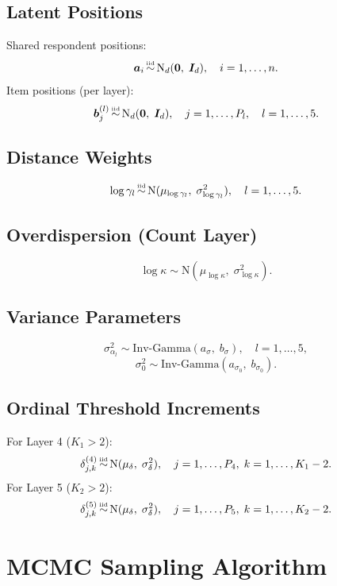 \documentclass[A4paper,11pt]{article}
\newcommand{\msim}{\mathop{\rm \sim}}
\newcommand{\iid}{\msim\limits^{\mbox{\tiny iid}}}
\begin{document}
\subsection{Latent Positions}

Shared respondent positions:
\[
  \bm{a}_i \iid \mathrm{N}_d(\bm{0},\; \bm{I}_d), \quad i=1,\dots,n.
\]
Item positions (per layer):
\[
  \bm{b}^{(l)}_j \iid \mathrm{N}_d(\bm{0},\; \bm{I}_d), \quad j=1,\dots,P_l, \quad l=1,\dots,5.
\]

\subsection{Distance Weights}

\[
  \log\gamma_l \iid \mathrm{N}(\mu_{\log\gamma_l},\; \sigma^2_{\log\gamma_l}), \quad l=1,\dots,5.
\]

\subsection{Overdispersion (Count Layer)}

\[
  \log\kappa \sim \mathrm{N}(\mu_{\log\kappa},\; \sigma^2_{\log\kappa}).
\]

\subsection{Variance Parameters}

\[
  \sigma^2_{\alpha_l} \sim \mathrm{Inv\text{-}Gamma}(a_\sigma,\; b_\sigma), \quad l=1,\dots,5,
\]
\[
  \sigma^2_0 \sim \mathrm{Inv\text{-}Gamma}(a_{\sigma_0},\; b_{\sigma_0}).
\]

\subsection{Ordinal Threshold Increments}

For Layer 4 ($K_1 > 2$):
\[
  \delta^{(4)}_{j,k} \iid \mathrm{N}(\mu_\delta,\; \sigma^2_\delta), \quad j=1,\dots,P_4,\; k=1,\dots,K_1-2.
\]
For Layer 5 ($K_2 > 2$):
\[
  \delta^{(5)}_{j,k} \iid \mathrm{N}(\mu_\delta,\; \sigma^2_\delta), \quad j=1,\dots,P_5,\; k=1,\dots,K_2-2.
\]

\section{MCMC Sampling Algorithm}
\end{document}
